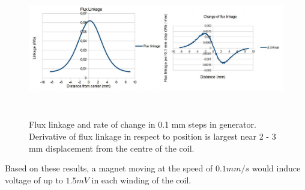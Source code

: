 \begin{figure}[htb]
\begin{center}
\includegraphics[height=6cm]{images/own_dwg/femm_flux_dualmagnet.jpg}
\end{center}
\caption{\label{fig:femm_linkage} Flux linkage and rate of change in 0.1 mm steps in generator. Derivative of flux linkage in respect to position is largest near 2 - 3 mm displacement from the centre of the coil.}
\end{figure}

Based on these results, a magnet moving at the speed of $0.1 mm / s $ would induce voltage of up to $1.5 mV$ in each winding of the coil.

